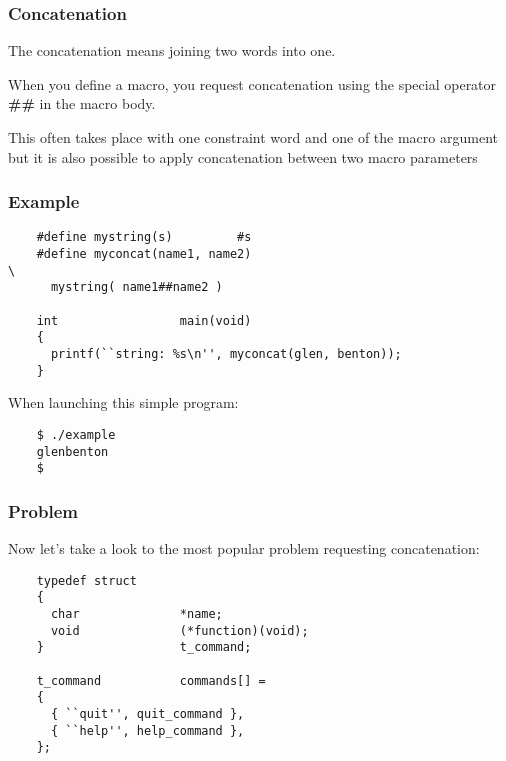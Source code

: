 
\begin{frame}
  \frametitle{Concatenation}

  The concatenation means joining two words into one.

  \nl

  When you define a macro, you request concatenation using the special
  operator \textbf{\#\#} in the macro body.

  \nl

  This often takes place with one constraint word and one of the macro
  argument but it is also possible to apply concatenation between two
  macro parameters
\end{frame}


\begin{frame}[containsverbatim]
  \frametitle{Example}

  \begin{verbatim}
    #define mystring(s)         #s
    #define myconcat(name1, name2)                                      \
      mystring( name1##name2 )

    int                 main(void)
    {
      printf(``string: %s\n'', myconcat(glen, benton));
    }
  \end{verbatim}

  When launching this simple program:

  \begin{verbatim}
    $ ./example
    glenbenton
    $ 
  \end{verbatim}
\end{frame}


\begin{frame}[containsverbatim]
  \frametitle{Problem}

  Now let's take a look to the most popular problem requesting concatenation:

  \begin{verbatim}
    typedef struct
    {
      char              *name;
      void              (*function)(void);
    }                   t_command;

    t_command           commands[] =
    {
      { ``quit'', quit_command },
      { ``help'', help_command },
    };
  \end{verbatim}
\end{frame}


